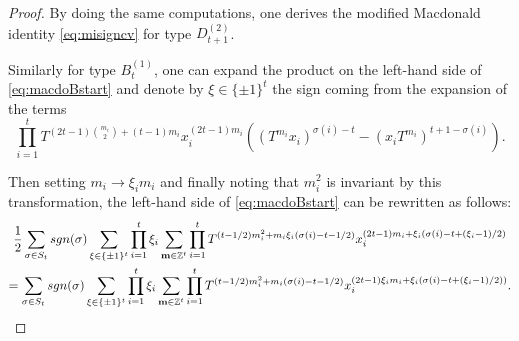 \documentclass[11pt,letterpaper]{amsart}
\def\bbbz{\mathbb Z}
\def\sgn{{\rm sgn}}
\numberwithin{equation}{section}
\numberwithin{df}{section}
\begin{document}
\begin{proof}
By doing the same computations, one derives the modified Macdonald identity \eqref{eq:misigncv} for type $D_{t+1}^{(2)}$.

%







\noindent  Similarly for type $B_t^{(1)}$, one can expand the product on the left-hand side of \eqref{eq:macdoBstart} and denote by $\xi\in\lbrace \pm 1\rbrace^t$ the sign coming from the expansion of the terms $$\prod_{i=1}^t T^{(2t-1)\binom{m_i}{2}+(t-1)m_i}x_i^{(2t-1)m_i}\left((T^{m_i}x_i)^{\sigma(i)-t}-(x_iT^{m_i})^{t+1-\sigma(i)}\right).$$

\noindent Then setting $m_i\to \xi_i m_i$ and finally noting that $m_i^2$ is invariant by this transformation, the left-hand side of \eqref{eq:macdoBstart} can be rewritten as follows:
\begin{multline*}
\frac{1}{2}\sum_{\sigma\in S_t}\sgn(\sigma) \sum_{\xi\in\lbrace \pm 1\rbrace^t}\prod_{i=1}^t \xi_i \sum_{\mathbf{m}\in\bbbz^t}\prod_{i=1}^t T^{(t-1/2)m_i^2+m_i \xi_i(\sigma(i)-t-1/2)} x_i^{(2t-1)m_i+\xi_i(\sigma(i)-t+(\xi_i-1)/2)}\\
=\sum_{\sigma\in S_t}\sgn(\sigma) \sum_{\xi\in\lbrace \pm 1\rbrace^t}\prod_{i=1}^t \xi_i\sum_{\mathbf{m}\in\bbbz^t}\prod_{i=1}^t  T^{(t-1/2)m_i^2+m_i(\sigma(i)-t-1/2)} x_i^{(2t-1)\xi_im_i+\xi_i(\sigma(i)-t+(\xi_i-1)/2))}.
\end{multline*}


\end{proof}
\end{document}
